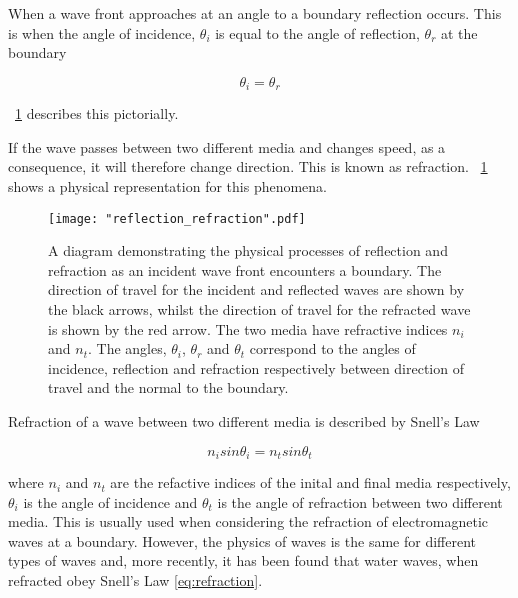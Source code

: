 \documentclass{article}
\newcommand{\figref}[2][\figurename~]{#1\ref{#2}}
\begin{document}
\vspace{2mm}
\noindent
When a wave front approaches at an angle to a boundary reflection occurs. This is when the angle of incidence, $\theta_i$ is equal to the angle of reflection, $\theta_r$ at the boundary

\begin{equation}
\label{eq:reflection}
\theta_i = \theta_r
\end{equation}

\vspace{2mm}
\noindent
\figref{fig:reflection_refraction} describes this pictorially.

\vspace{2mm}
\noindent
If the wave passes between two different media and changes speed, as a consequence, it will therefore change direction. This is known as refraction. \figref{fig:reflection_refraction} shows a physical representation for this phenomena.

\begin{figure}[h]
\centering
\texttt{[image: "reflection\_refraction".pdf]}
\caption{A diagram demonstrating the physical processes of reflection and refraction as an incident wave front encounters a boundary. The direction of travel for the incident and reflected waves are shown by the black arrows, whilst the direction of travel for the refracted wave is shown by the red arrow. The two media have refractive indices $n_i$ and $n_t$. The angles, $\theta_i$, $\theta_r$ and $\theta_t$ correspond to the angles of incidence, reflection and refraction respectively between direction of travel and the normal to the boundary.}
\label{fig:reflection_refraction}
\end{figure}

\vspace{2mm}
\noindent
Refraction of a wave between two different media is described by Snell's Law

\begin{equation}
\label{eq:refraction}
n_i sin{\theta_i} = n_t sin{\theta_t}
\end{equation}


\vspace{2mm}
\noindent
where $n_i$ and $n_t$ are the refactive indices of the inital and final media respectively, $\theta_i$ is the angle of incidence and $\theta_t$ is the angle of refraction between two different media. This is usually used when considering the refraction of electromagnetic waves at a boundary. However, the physics of waves is the same for different types of waves and, more recently, it has been found \cite{Web01} that water waves, when refracted obey Snell's Law \eqref{eq:refraction}.
\end{document}
